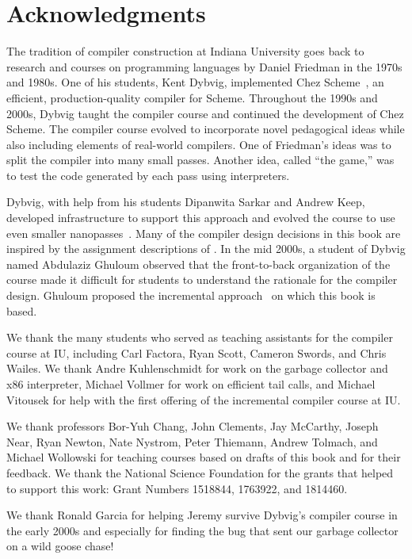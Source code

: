 \documentclass[7x10]{TimesAPriori_MIT}%
\numberwithin{theorem}{chapter}
\numberwithin{definition}{chapter}
\numberwithin{equation}{chapter}
\begin{document}
\section*{Acknowledgments}

The tradition of compiler construction at Indiana University goes back
to research and courses on programming languages by Daniel Friedman in
the 1970s and 1980s.  One of his students, Kent Dybvig, implemented
Chez Scheme~\citep{Dybvig:2006aa}, an efficient, production-quality
compiler for Scheme.  Throughout the 1990s and 2000s, Dybvig taught
the compiler course and continued the development of Chez Scheme.
%
The compiler course evolved to incorporate novel pedagogical ideas
while also including elements of real-world compilers.  One of
Friedman's ideas was to split the compiler into many small
passes. Another idea, called ``the game,'' was to test the code
generated by each pass using interpreters.

Dybvig, with help from his students Dipanwita Sarkar and Andrew Keep,
developed infrastructure to support this approach and evolved the
course to use even smaller
nanopasses~\citep{Sarkar:2004fk,Keep:2012aa}.  Many of the compiler
design decisions in this book are inspired by the assignment
descriptions of \citet{Dybvig:2010aa}. In the mid 2000s, a student of
Dybvig named Abdulaziz Ghuloum observed that the front-to-back
organization of the course made it difficult for students to
understand the rationale for the compiler design. Ghuloum proposed the
incremental approach~\citep{Ghuloum:2006bh} on which this book is
based.

We thank the many students who served as teaching assistants for the
compiler course at IU, including Carl Factora, Ryan Scott, Cameron
Swords, and Chris Wailes. We thank Andre Kuhlenschmidt for work on the
garbage collector and x86 interpreter, Michael Vollmer for work on
efficient tail calls, and Michael Vitousek for help with the first
offering of the incremental compiler course at IU.

We thank professors Bor-Yuh Chang, John Clements, Jay McCarthy, Joseph
Near, Ryan Newton, Nate Nystrom, Peter Thiemann, Andrew Tolmach, and
Michael Wollowski for teaching courses based on drafts of this book
and for their feedback. We thank the National Science Foundation for
the grants that helped to support this work: Grant Numbers 1518844,
1763922, and 1814460.

We thank Ronald Garcia for helping Jeremy survive Dybvig's compiler
course in the early 2000s and especially for finding the bug that
sent our garbage collector on a wild goose chase!
\end{document}
